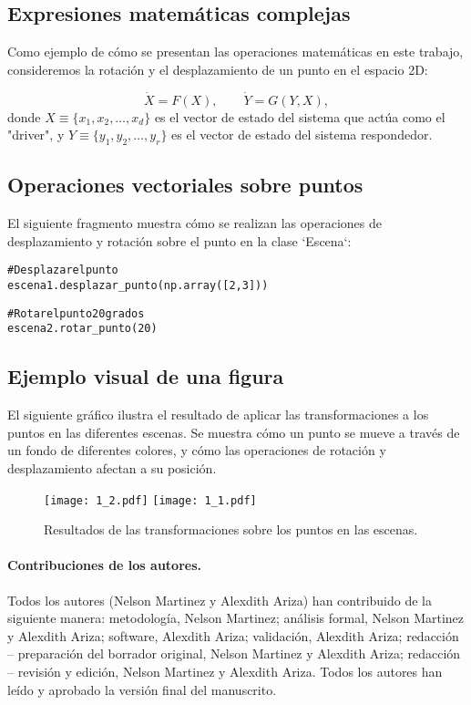 \documentclass[a4paper, 10pt]{article}
\begin{document}
\subsection{Expresiones matemáticas complejas}\label{s:2.1}
Como ejemplo de cómo se presentan las operaciones matemáticas en este trabajo, consideremos la rotación y el desplazamiento de un punto en el espacio 2D:

\begin{equation}\label{eq:1}
   \dot{X}=F(X),\qquad \dot{Y}=G(Y,X),
\end{equation}
donde \(X \equiv \{x_1, x_2, \dots, x_d\}\) es el vector de estado del sistema que actúa como el "driver", y \(Y \equiv \{y_1, y_2, \dots, y_r\}\) es el vector de estado del sistema respondedor.

\subsection{Operaciones vectoriales sobre puntos}\label{s:2.2}
El siguiente fragmento muestra cómo se realizan las operaciones de desplazamiento y rotación sobre el punto en la clase `Escena`:

{\small
\begin{alltt}
# Desplazar el punto
escena1.desplazar_punto(np.array([2, 3]))

# Rotar el punto 20 grados
escena2.rotar_punto(20)
\end{alltt}}

\subsection{Ejemplo visual de una figura}\label{s:2.3}
El siguiente gráfico ilustra el resultado de aplicar las transformaciones a los puntos en las diferentes escenas. Se muestra cómo un punto se mueve a través de un fondo de diferentes colores, y cómo las operaciones de rotación y desplazamiento afectan a su posición.

\begin{figure}[ht]
\centering
\texttt{[image: 1\_2.pdf]}\quad
\texttt{[image: 1\_1.pdf]}
\caption{Resultados de las transformaciones sobre los puntos en las escenas.}\label{fig:1}
\end{figure}

\paragraph{Contribuciones de los autores.} Todos los autores (Nelson Martinez y Alexdith Ariza) han contribuido de la siguiente manera: metodología, Nelson Martinez; análisis formal, Nelson Martinez y Alexdith Ariza; software, Alexdith Ariza; validación, Alexdith Ariza; redacción – preparación del borrador original, Nelson Martinez y Alexdith Ariza; redacción – revisión y edición, Nelson Martinez y Alexdith Ariza. Todos los autores han leído y aprobado la versión final del manuscrito.
\end{document}
